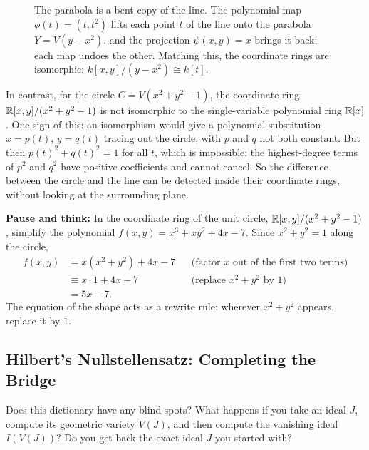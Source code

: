 \begin{figure}[htbp]
\caption{The parabola is a bent copy of the line. The polynomial map $\phi(t) = (t, t^2)$ lifts each point $t$ of the line onto the parabola $Y = V(y - x^2)$, and the projection $\psi(x, y) = x$ brings it back; each map undoes the other. Matching this, the coordinate rings are isomorphic: $k[x, y]/(y - x^2) \cong k[t]$.}\label{alggeom:fig-parabola-line-isom}
\end{figure}

In contrast, for the circle $C = V(x^2 + y^2 - 1)$, the coordinate ring $\mathbb{R}[x, y]/(x^2 + y^2 - 1)$ is not isomorphic to the single-variable polynomial ring $\mathbb{R}[x]$. One sign of this: an isomorphism would give a polynomial substitution $x = p(t),\, y = q(t)$ tracing out the circle, with $p$ and $q$ not both constant. But then $p(t)^2 + q(t)^2 = 1$ for all $t$, which is impossible: the highest-degree terms of $p^2$ and $q^2$ have positive coefficients and cannot cancel. So the difference between the circle and the line can be detected inside their coordinate rings, without looking at the surrounding plane.

\begin{recoverybox}
\textbf{Pause and think:} In the coordinate ring of the unit circle, $\mathbb{R}[x, y]/(x^2 + y^2 - 1)$, simplify the polynomial $f(x, y) = x^3 + x y^2 + 4x - 7$. Since $x^2 + y^2 = 1$ along the circle,
\begin{align*}
f(x, y) &= x(x^2 + y^2) + 4x - 7 && \text{(factor $x$ out of the first two terms)}\\
&\equiv x \cdot 1 + 4x - 7 && \text{(replace $x^2 + y^2$ by $1$)}\\
&= 5x - 7.
\end{align*}
The equation of the shape acts as a rewrite rule: wherever $x^2 + y^2$ appears, replace it by $1$.
\end{recoverybox}

\subsection{Hilbert's Nullstellensatz: Completing the Bridge}

Does this dictionary have any blind spots? What happens if you take an ideal $J$, compute its geometric variety $V(J)$, and then compute the vanishing ideal $I(V(J))$? Do you get back the exact ideal $J$ you started with?


